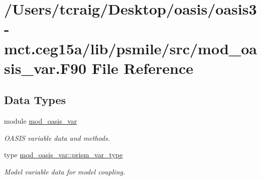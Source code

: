 \hypertarget{mod__oasis__var_8_f90}{\section{/\+Users/tcraig/\+Desktop/oasis/oasis3-\/mct.ceg15a/lib/psmile/src/mod\+\_\+oasis\+\_\+var.F90 File Reference}
\label{mod__oasis__var_8_f90}
}
\subsection*{Data Types}
\begin{DoxyCompactItemize}
\item 
module \hyperlink{classmod__oasis__var}{mod\+\_\+oasis\+\_\+var}
\begin{DoxyCompactList}\small\item\em O\+A\+S\+I\+S variable data and methods. \end{DoxyCompactList}\item 
type \hyperlink{structmod__oasis__var_1_1prism__var__type}{mod\+\_\+oasis\+\_\+var\+::prism\+\_\+var\+\_\+type}
\begin{DoxyCompactList}\small\item\em Model variable data for model coupling. \end{DoxyCompactList}\end{DoxyCompactItemize}
